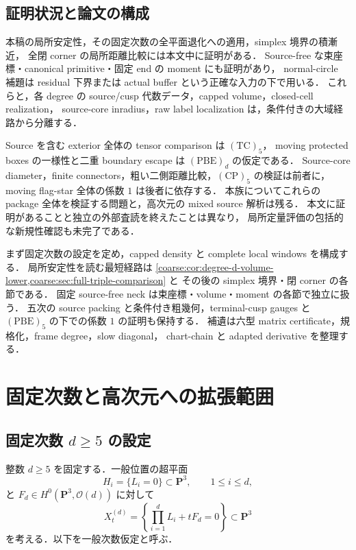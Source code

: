 \documentclass[a4paper,11pt]{ltjsarticle}
\numberwithin{equation}{section}
\theoremstyle{plain}
\theoremstyle{definition}
\theoremstyle{remark}
\newcommand{\PP}{\mathbf P}\newcommand{\CC}{\mathbf C}\newcommand{\RR}{\mathbf R}\newcommand{\ZZ}{\mathbf Z}\newcommand{\NN}{\mathbf N}
\begin{document}
\subsection{証明状況と論文の構成}
本稿の局所安定性，その固定次数の全平面退化への適用，simplex 境界の積漸近，
全閉 corner の局所距離比較には本文中に証明がある．
Source-free な束座標・canonical primitive・固定 end の moment にも証明があり，
normal-circle 補題は residual 下界または actual buffer という正確な入力の下で用いる．
これらと，各 degree の source/cusp 代数データ，capped volume，closed-cell realization，
source-core inradius，raw label localization は，条件付きの大域経路から分離する．

Source を含む exterior 全体の tensor comparison は $\mathrm{(TC)}_5$，
moving protected boxes の一様性と二重 boundary escape は $\mathrm{(PBE)}_d$ の仮定である．
Source-core diameter，finite connectors，粗い二側距離比較，$\mathrm{(CP)}_5$ の検証は前者に，
moving flag-star 全体の係数 $1$ は後者に依存する．
本族についてこれらの package 全体を検証する問題と，高次元の mixed source 解析は残る．
本文に証明があることと独立の外部査読を終えたことは異なり，
局所定量評価の包括的な新規性確認も未完了である．

まず固定次数の設定を定め，capped density と complete local windows を構成する．
局所安定性を読む最短経路は
\cref{coarse:cor:degree-d-volume-lower,coarse:sec:full-triple-comparison} と
その後の simplex 境界・閉 corner の各節である．
固定 source-free neck は束座標・volume・moment の各節で独立に扱う．
五次の source packing と条件付き粗幾何，terminal-cusp gauges と
$\mathrm{(PBE)}_5$ の下での係数 $1$ の証明も保持する．
補遺は六型 matrix certificate，規格化，frame degree，slow diagonal，
chart-chain と adapted derivative を整理する．

\section{固定次数と高次元への拡張範囲}\label{sec:fixed-degree-extension}

\subsection{固定次数 $d\ge5$ の設定}

整数 $d\ge5$ を固定する．一般位置の超平面
\[
 H_i=\{L_i=0\}\subset\PP^3,
 \qquad 1\le i\le d,
\]
と $F_d\in H^0(\PP^3,\mathcal O(d))$ に対して
\begin{equation}\label{eq:degree-d-family}
 X_t^{(d)}=
 \left\{\prod_{i=1}^dL_i+tF_d=0\right\}\subset\PP^3
\end{equation}
を考える．以下を一般次数仮定と呼ぶ．
\end{document}
